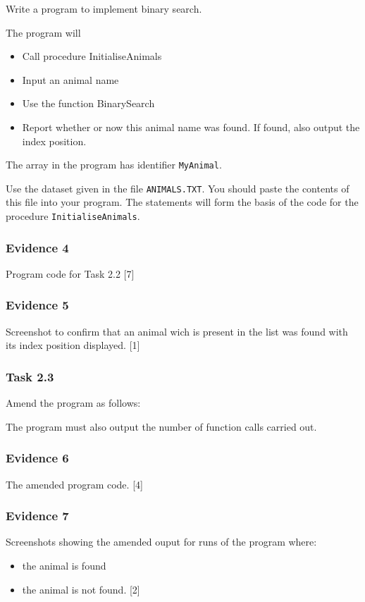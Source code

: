 Write a program to implement binary search. 

The program will
\begin{itemize}
\item Call procedure InitialiseAnimals 
\item Input an animal name
\item Use the function BinarySearch 
\item Report whether or now this animal name was found. If found, also output
the index position.
\end{itemize}
The array in the program has identifier \texttt{MyAnimal}. 

Use the dataset given in the file \texttt{ANIMALS.TXT}. You should
paste the contents of this file into your program. The statements
will form the basis of the code for the procedure \texttt{InitialiseAnimals}.

\subsubsection*{Evidence 4}

Program code for Task 2.2 \hfill{}{[}7{]}

\subsubsection*{Evidence 5}

Screenshot to confirm that an animal wich is present in the list was
found with its index position displayed. \hfill{}{[}1{]}

\subsubsection*{Task 2.3}

Amend the program as follows: 

The program must also output the number of function calls carried
out.

\subsubsection*{Evidence 6}

The amended program code. \hfill{}{[}4{]}

\subsubsection*{Evidence 7}

Screenshots showing the amended ouput for runs of the program where: 
\begin{itemize}
\item the animal is found
\item the animal is not found. \hfill{}{[}2{]}
\end{itemize}